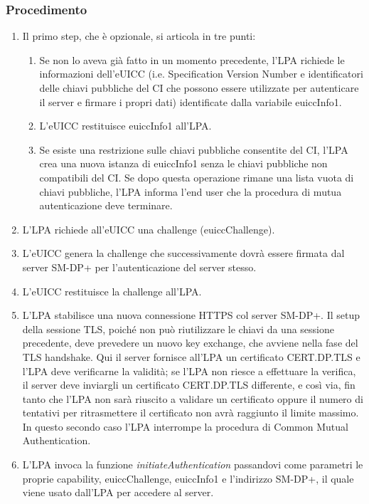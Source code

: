 \documentclass[10pt, oneside]{book}
\begin{document}
\subsubsection{Procedimento}
\begin{enumerate}
\item Il primo step, che è opzionale, si articola in tre punti:
\begin{enumerate}[label=\alph*)]
\item Se non lo aveva già fatto in un momento precedente, l'LPA richiede le informazioni dell'eUICC (i.e. Specification Version Number e identificatori delle chiavi pubbliche del CI che possono essere utilizzate per autenticare il server e firmare i propri dati) identificate dalla variabile euiccInfo1.
\item L'eUICC restituisce euiccInfo1 all'LPA.
\item Se esiste una restrizione sulle chiavi pubbliche consentite del CI, l'LPA crea una nuova istanza di euiccInfo1 senza le chiavi pubbliche non compatibili del CI. Se dopo questa operazione rimane una lista vuota di chiavi pubbliche, l'LPA informa l'end user che la procedura di mutua autenticazione deve terminare.
\end{enumerate}
\item L'LPA richiede all'eUICC una challenge (euiccChallenge).
\item L'eUICC genera la challenge che successivamente dovrà essere firmata dal server SM-DP+ per l'autenticazione del server stesso.
\item L'eUICC restituisce la challenge all'LPA.
\item L'LPA stabilisce una nuova connessione HTTPS col server SM-DP+. Il setup della sessione TLS, poiché non può riutilizzare le chiavi da una sessione precedente, deve prevedere un nuovo key exchange, che avviene nella fase del TLS handshake. Qui il server fornisce all'LPA un certificato CERT.DP.TLS e l'LPA deve verificarne la validità; se l'LPA non riesce a effettuare la verifica, il server deve inviargli un certificato CERT.DP.TLS differente, e così via, fin tanto che l'LPA non sarà riuscito a validare un certificato oppure il numero di tentativi per ritrasmettere il certificato non avrà raggiunto il limite massimo. In questo secondo caso l'LPA interrompe la procedura di Common Mutual Authentication.
\item L'LPA invoca la funzione \textit{initiateAuthentication} passandovi come parametri le proprie capability, euiccChallenge, euiccInfo1 e l'indirizzo SM-DP+, il quale viene usato dall'LPA per accedere al server.

\end{enumerate}
\end{document}
